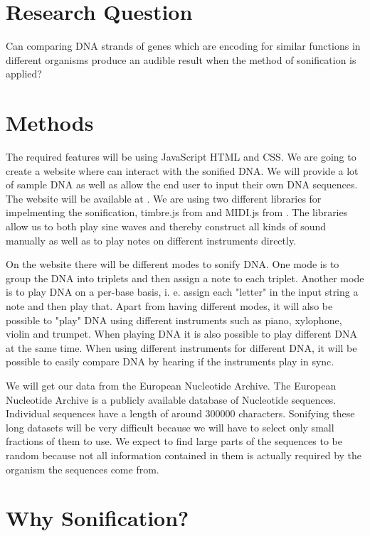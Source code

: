 \documentclass[10pt]{article}
\begin{document}
\section{Research Question}
Can comparing DNA strands of genes which are encoding for similar functions in different organisms produce an audible result when the method of sonification is applied?

\section{Methods}
The required features will be using JavaScript HTML and CSS. We are going to create a website where can interact with the sonified DNA. We will provide a lot of sample DNA as well as allow the end user to input their own DNA sequences. The website will be available at \cite{site:letthednaspeak}. We are using two different libraries for impelmenting the sonification, timbre.js from \cite{libs:timbrejs} and MIDI.js from \cite{libs:midijs}. The libraries allow us to both play sine waves and thereby construct all kinds of sound manually as well as to play notes on different instruments directly. 

On the website there will be different modes to sonify DNA. One mode is to group the DNA into triplets and then assign a note to each triplet. Another mode is to play DNA on a per-base basis, i. e. assign each "letter" in the input string a note and then play that. Apart from having different modes, it will also be possible to "play" DNA using different instruments such as piano, xylophone, violin and trumpet. When playing DNA it is also possible to play different DNA at the same time. When using different instruments for different DNA, it will be possible to easily compare DNA by hearing if the instruments play in sync. 

We will get our data from the European Nucleotide Archive. The European Nucleotide Archive is a publicly available database of Nucleotide sequences. Individual sequences have a length of around 300000 characters. Sonifying these long datasets will be very difficult because we will have to select only small fractions of them to use. We expect to find large parts of the sequences to be random because not all information contained in them is actually required by the organism the sequences come from.

\section{Why Sonification?}
\end{document}
